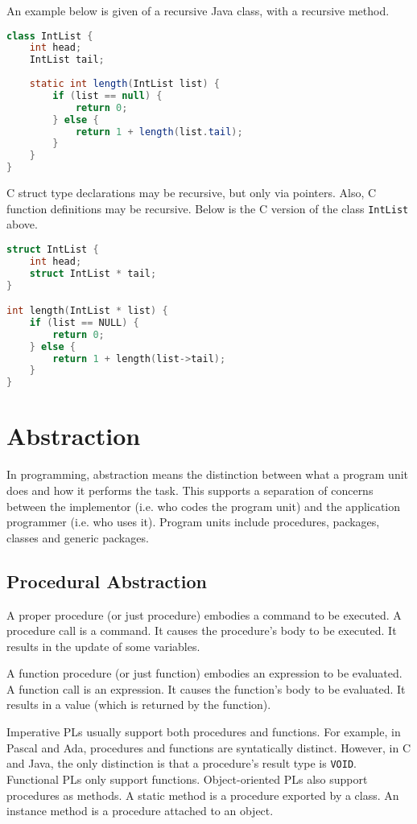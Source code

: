 \documentclass[a4paper, openany]{memoir}
\begin{document}
An example below is given of a recursive Java class, with a recursive method.
\begin{lstlisting}[language=Java]
class IntList {
    int head;
    IntList tail;
    
    static int length(IntList list) {
        if (list == null) {
            return 0;
        } else {
            return 1 + length(list.tail);
        }
    }
}
\end{lstlisting}
C struct type declarations may be recursive, but only via pointers. Also, C function definitions may be recursive. Below is the C version of the class \texttt{IntList} above.
\begin{lstlisting}[language=C]
struct IntList {
    int head;
    struct IntList * tail;
}

int length(IntList * list) {
    if (list == NULL) {
        return 0;
    } else {
        return 1 + length(list->tail);
    }
}
\end{lstlisting}
\newpage

\section{Abstraction}
In programming, abstraction means the distinction between what a program unit does and how it performs the task. This supports a separation of concerns between the implementor (i.e. who codes the program unit) and the application programmer (i.e. who uses it). Program units include procedures, packages, classes and generic packages.

\subsection{Procedural Abstraction}
A proper procedure (or just procedure) embodies a command to be executed. A procedure call is a command. It causes the procedure's body to be executed. It results in the update of some variables.

A function procedure (or just function) embodies an expression to be evaluated. A function call is an expression. It causes the function's body to be evaluated. It results in a value (which is returned by the function).

Imperative PLs usually support both procedures and functions. For example, in Pascal and Ada, procedures and functions are syntatically distinct. However, in C and Java, the only distinction is that a procedure's result type is \texttt{VOID}. Functional PLs only support functions. Object-oriented PLs also support procedures as methods. A static method is a procedure exported by a class. An instance method is a procedure attached to an object.
\end{document}
